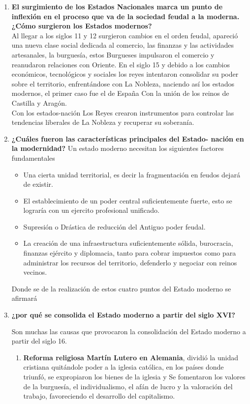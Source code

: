 \documentclass[12pt]{book}
\begin{document}
\begin{enumerate}
\item \textbf{El surgimiento de los Estados Nacionales marca un punto de inflexión en el proceso
que va de la sociedad feudal a la moderna. ¿Cómo surgieron los Estados modernos?} \\
Al llegar a los siglos 11 y 12 surgieron cambios en el orden feudal, apareció una nueva clase social dedicada al comercio, las finanzas y las actividades artesanales,  la burguesía, estos Burgueses impulsaron el comercio y reanudaron relaciones con Oriente.
En el siglo 15 y debido a los cambios económicos, tecnológicos y sociales los reyes intentaron consolidar su poder sobre el territorio, enfrentándose con La Nobleza, naciendo así los estados modernos, el primer caso fue el de España Con la unión de los reinos de Castilla y Aragón. \\
Con los estados-nación Los Reyes crearon instrumentos para controlar las tendencias liberales de La Nobleza y recuperar su soberanía. \\


\item \textbf{¿Cuáles fueron las características principales del Estado- nación en la modernidad?}
Un estado moderno necesitan los siguientes factores fundamentales
\begin{itemize}
\item Una cierta unidad territorial, es decir la fragmentación en feudos dejará de existir.
\item El establecimiento de un poder central suficientemente fuerte, esto se lograría con un ejercito profesional unificado.
\item Supresión  o Drástica de reducción del Antiguo poder feudal.
\item La creación de una infraestructura suficientemente sólida, burocracia, finanzas ejército y diplomacia, tanto para cobrar impuestos como para administrar los recursos del territorio, defenderlo y negociar con reinos vecinos.
\end{itemize}
Donde se de la realización de estos cuatro puntos del Estado moderno se afirmará 


\item \textbf{¿por qué se consolida el Estado moderno a partir del siglo XVI?}

Son muchas las causas que provocaron la consolidación del Estado moderno a partir del siglo 16.
\begin{enumerate}

\item \textbf{Reforma religiosa Martín Lutero en Alemania}, dividió la unidad cristiana quitándole poder a la iglesia católica, en los países donde triunfó, se expropiaron los bienes de la iglesia y Se fomentaron los valores de la burguesía, el individualismo, el afán de lucro y la valoración del trabajo, favoreciendo el desarrollo del capitalismo.


\end{enumerate}
\end{enumerate}
\end{document}
